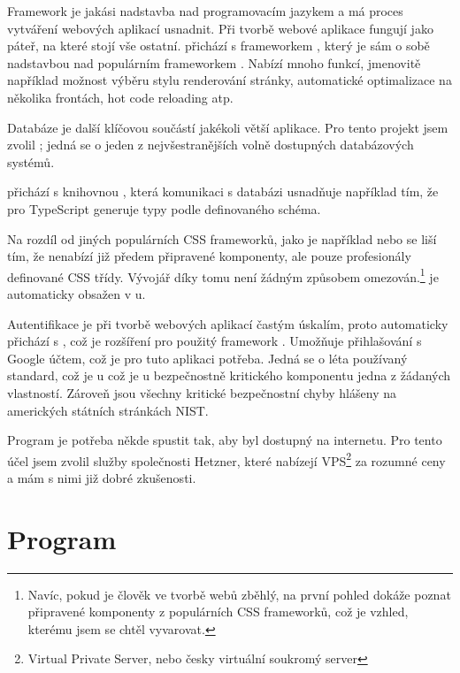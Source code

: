 Framework je jakási nadstavba nad programovacím jazykem a má proces vytváření webových aplikací usnadnit. Při tvorbě webové aplikace fungují jako páteř, na které stojí vše ostatní.  přichází s frameworkem , který je sám o sobě nadstavbou nad populárním frameworkem . Nabízí mnoho funkcí, jmenovitě například možnost výběru stylu renderování stránky, automatické optimalizace na několika frontách, hot code reloading atp.\cite{nextjs}

Databáze je další klíčovou součástí jakékoli větší aplikace. Pro tento projekt jsem zvolil ; jedná se o jeden z nejvšestranějších volně dostupných databázových systémů.

 přichází s knihovnou , která komunikaci s databázi usnadňuje například tím, že pro TypeScript generuje typy podle definovaného schéma.

Na rozdíl od jiných populárních CSS frameworků, jako je například  nebo  se  liší tím, že nenabízí již předem připravené komponenty, ale pouze profesionály definované CSS třídy. Vývojář díky tomu není žádným způsobem omezován.\footnote{Navíc, pokud je člověk ve tvorbě webů zběhlý, na první pohled dokáže poznat připravené komponenty z populárních CSS frameworků, což je vzhled, kterému jsem se chtěl vyvarovat.}  je automaticky obsažen v u.

Autentifikace je při tvorbě webových aplikací častým úskalím, proto  automaticky přichází s , což je rozšíření pro použitý framework . Umožňuje přihlašování s Google účtem, což je pro tuto aplikaci potřeba. Jedná se o léta používaný standard, což je u což je u bezpečnostně kritického komponentu jedna z žádaných vlastností. Zároveň jsou všechny kritické bezpečnostní chyby hlášeny na amerických státních stránkách NIST.

Program je potřeba někde spustit tak, aby byl dostupný na internetu. Pro tento účel jsem zvolil služby společnosti Hetzner, které nabízejí VPS\footnote{Virtual Private Server, nebo česky virtuální soukromý server} za rozumné ceny a mám s nimi již dobré zkušenosti. 

\section{Program}

